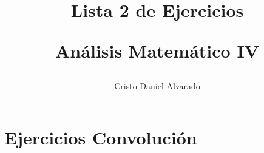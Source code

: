 \documentclass[12pt]{report}
\theoremstyle{largebreak}
\begin{document}
    \setlength{\parskip}{5pt} %
    \setlength{\parindent}{12pt} %
    \title{Lista 2 de Ejercicios 
    
    Análisis Matemático IV
    }
    \author{Cristo Daniel Alvarado}
    \maketitle

    \tableofcontents %

    
    \chapter{Ejercicios Convolución}
    
    \setcounter{section}{1}

    \renewcommand{\theenumi}{\roman{enumi}}
\end{document}
